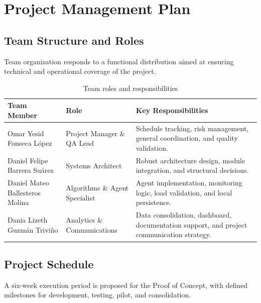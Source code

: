 \documentclass[12pt,a4paper]{article}
\begin{document}
\section{Project Management Plan}

\subsection{Team Structure and Roles}
Team organization responds to a functional distribution aimed at ensuring technical and operational coverage of the project.

\begin{table}[H]
\caption{Team roles and responsibilities}
\label{tab:roles}
\centering
\begin{tabular}{|p{3cm}|p{4.8cm}|p{6cm}|}
\hline
\textbf{Team Member} & \textbf{Role} & \textbf{Key Responsibilities} \\
\hline
Omar Yesid Fonseca López & Project Manager \& QA Lead & Schedule tracking, risk management, general coordination, and quality validation. \\
\hline
Daniel Felipe Barrera Suárez & Systems Architect & Robust architecture design, module integration, and structural decisions. \\
\hline
Daniel Mateo Ballesteros Molina & Algorithms \& Agent Specialist & Agent implementation, monitoring logic, load validation, and local persistence. \\
\hline
Dania Lizeth Guzmán Triviño & Analytics \& Communications & Data consolidation, dashboard, documentation support, and project communication strategy. \\
\hline
\end{tabular}
\end{table}

\subsection{Project Schedule}
A six-week execution period is proposed for the Proof of Concept, with defined milestones for development, testing, pilot, and consolidation.
\end{document}
